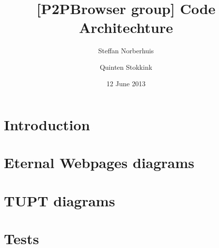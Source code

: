 \documentclass[a4paper,11pt]{article}
\title{[P2PBrowser group] Code Architechture}
\author{Steffan Norberhuis \and Quinten Stokkink}
\date{12 June 2013}
\begin{document}
   \maketitle

\section{Introduction}

\section{Eternal Webpages diagrams}


\section{TUPT diagrams}


\section{Tests}

\end{document}

